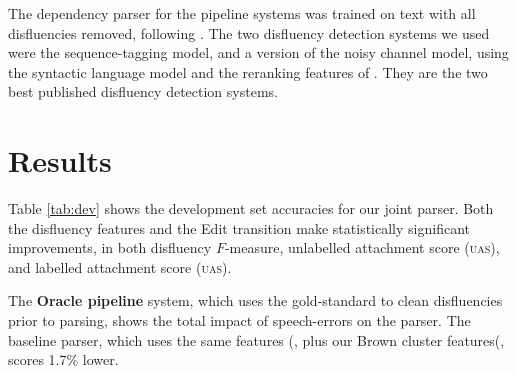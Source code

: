 \documentclass[11pt,letterpaper]{article}
\begin{document}
The dependency parser for the pipeline systems was trained on text with all disfluencies
removed, following \citet{Charniak01a}. 
The two disfluency detection systems we used were the \citet{qian:13} sequence-tagging
model, and a version of the \citet{Johnson04a} noisy channel model, using the
\citet{Charniak01b} syntactic language model and the reranking features of
\citet{zwarts:11}. They are the two best published disfluency detection systems.




\section{Results}
\label{sec:results}

Table \ref{tab:dev} shows the development set accuracies for our joint parser.
Both the disfluency features and the 
Edit transition make statistically significant improvements, in both
disfluency $F$-measure, unlabelled attachment score (\textsc{uas}), and
labelled attachment score (\textsc{uas}).

The \textbf{Oracle pipeline} system, which uses the gold-standard to clean disfluencies
prior to parsing, shows the total impact of speech-errors on the parser.  The
baseline parser, which uses the same features (\citet{zhang:11}, plus our Brown
cluster features(, scores 1.7\% lower. 
\end{document}
